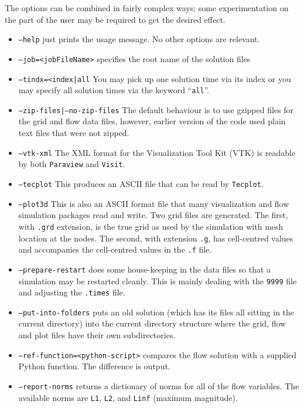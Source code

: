 \noindent
The options can be combined in fairly complex ways; some experimentation on the part of the user
may be required to get the desired effect.
\begin{itemize}
  \item \texttt{--help} just prints the usage message.  No other options are relevant.
  \item \texttt{--job=<jobFileName>} specifies the root name of the solution files
  \item \texttt{--tindx=<index|all} You may pick up one solution time via its index or you may
     specify all solution times via the keyword ``\texttt{all}''.
  \item \texttt{--zip-files|--no-zip-files} The default behaviour is to use gzipped files for the
     grid and flow data files, however, earlier version of the code used plain text files that were not zipped.
  \item \texttt{--vtk-xml} The XML format for the Visualization Tool Kit (VTK) is readable by both \texttt{Paraview}
     and \texttt{Visit}.
  \item \texttt{--tecplot} This produces an ASCII file that can be read by \texttt{Tecplot}.
  \item \texttt{--plot3d} This is also an ASCII format file that many visualization and flow simulation
     packages read and write.
     Two grid files are generated.  The first, with \texttt{.grd} extension, 
     is the true grid as used by the simulation with mesh location at the nodes.  
     The second, with extension \texttt{.g}, has cell-centred values and accompanies 
     the cell-centred values in the \texttt{.f} file.
  \item \texttt{--prepare-restart} does some house-keeping in the data files so that a simulation 
     may be restarted cleanly.  
     This is mainly dealing with the \texttt{9999} file and adjusting the \texttt{.times} file.
  \item \texttt{--put-into-folders} puts an old solution (which has its files all sitting in the current directory)
     into the current directory structure where the grid, flow and plot files have their own subdirectories.
  \item \texttt{--ref-function=<python-script>} compares the flow solution with a supplied Python function.
     The difference is output.
  \item \texttt{--report-norms} returns a dictionary of norms for all of the flow variables.
    The available norms are \texttt{L1}, \texttt{L2}, and \texttt{Linf} (maximum magnitude).

\end{itemize}
